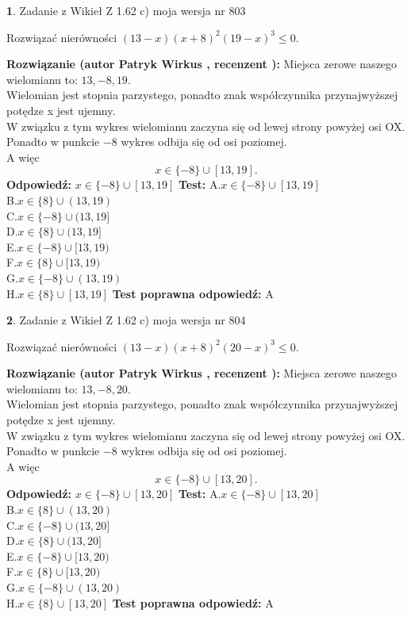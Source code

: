 \documentclass[12pt, a4paper]{article}
\theoremstyle{definition} %
\newtheorem{zad}{}
\newcommand{\zadStart}[1]{\begin{zad}#1\newline}
\newcommand{\zadStop}{\end{zad}}
\newcommand{\rozwStart}[2]{\noindent \textbf{Rozwiązanie (autor #1 , recenzent #2): }\newline}
\newcommand{\rozwStop}{\newline}
\newcommand{\odpStart}{\noindent \textbf{Odpowiedź:}\newline}
\newcommand{\odpStop}{\newline}
\newcommand{\testStart}{\noindent \textbf{Test:}\newline}
\newcommand{\testStop}{\newline}
\newcommand{\kluczStart}{\noindent \textbf{Test poprawna odpowiedź:}\newline}
\newcommand{\kluczStop}{\newline}
\begin{document}
\zadStart{Zadanie z Wikieł Z 1.62 c) moja wersja nr 803}

Rozwiązać nierówności $(13-x)(x+8)^{2}(19-x)^{3}\le0$.
\zadStop
\rozwStart{Patryk Wirkus}{}
Miejsca zerowe naszego wielomianu to: $13, -8, 19$.\\
Wielomian jest stopnia parzystego, ponadto znak współczynnika przy\linebreak najwyższej potędze x jest ujemny.\\ W związku z tym wykres wielomianu zaczyna się od lewej strony powyżej osi OX.\\
Ponadto w punkcie $-8$ wykres odbija się od osi poziomej.\\
A więc $$x \in \{-8\} \cup [13,19].$$
\rozwStop
\odpStart
$x \in \{-8\} \cup [13,19]$
\odpStop
\testStart
A.$x \in \{-8\} \cup [13,19]$\\
B.$x \in \{8\} \cup (13,19)$\\
C.$x \in \{-8\} \cup (13,19]$\\
D.$x \in \{8\} \cup (13,19]$\\
E.$x \in \{-8\} \cup [13,19)$\\
F.$x \in \{8\} \cup [13,19)$\\
G.$x \in \{-8\} \cup (13,19)$\\
H.$x \in \{8\} \cup [13,19]$
\testStop
\kluczStart
A
\kluczStop



\zadStart{Zadanie z Wikieł Z 1.62 c) moja wersja nr 804}

Rozwiązać nierówności $(13-x)(x+8)^{2}(20-x)^{3}\le0$.
\zadStop
\rozwStart{Patryk Wirkus}{}
Miejsca zerowe naszego wielomianu to: $13, -8, 20$.\\
Wielomian jest stopnia parzystego, ponadto znak współczynnika przy\linebreak najwyższej potędze x jest ujemny.\\ W związku z tym wykres wielomianu zaczyna się od lewej strony powyżej osi OX.\\
Ponadto w punkcie $-8$ wykres odbija się od osi poziomej.\\
A więc $$x \in \{-8\} \cup [13,20].$$
\rozwStop
\odpStart
$x \in \{-8\} \cup [13,20]$
\odpStop
\testStart
A.$x \in \{-8\} \cup [13,20]$\\
B.$x \in \{8\} \cup (13,20)$\\
C.$x \in \{-8\} \cup (13,20]$\\
D.$x \in \{8\} \cup (13,20]$\\
E.$x \in \{-8\} \cup [13,20)$\\
F.$x \in \{8\} \cup [13,20)$\\
G.$x \in \{-8\} \cup (13,20)$\\
H.$x \in \{8\} \cup [13,20]$
\testStop
\kluczStart
A
\kluczStop
\end{document}
